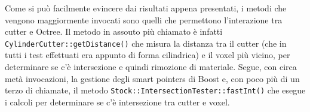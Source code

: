 Come si può facilmente evincere dai risultati appena presentati, i metodi che vengono maggiormente invocati sono quelli che permettono l'interazione tra cutter e Octree. Il metodo in assouto più chiamato è infatti \texttt{CylinderCutter::getDistance()} che misura la distanza tra il cutter (che in tutti i test effettuati era appunto di forma cilindrica) e il voxel più vicino, per determinare se c'è intersezione e quindi rimozione di materiale. Segue, con circa metà invocazioni, la gestione degli smart pointers di Boost e, con poco più di un terzo di chiamate, il metodo \texttt{Stock::IntersectionTester::fastInt()} che esegue i calcoli per determinare se c'è intersezione tra cutter e voxel.

